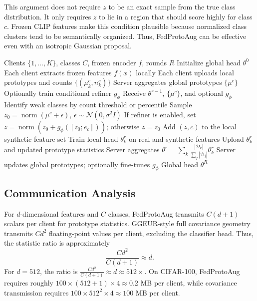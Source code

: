 ﻿\documentclass[conference]{IEEEtran}
\newcommand{\method}{FedProtoAug}
\newcommand{\clip}{CLIP}
\begin{document}
This argument does not require $z$ to be an exact sample from the true class distribution. It only requires $z$ to lie in a region that should score highly for class $c$. Frozen \clip{} features make this condition plausible because normalized class clusters tend to be semantically organized. Thus, \method{} can be effective even with an isotropic Gaussian proposal.

\begin{algorithm}[t]
\caption{\method}
\label{alg:fedprotoaug}
\begin{algorithmic}[1]
\Require Clients $\{1,\ldots,K\}$, classes $C$, frozen encoder $f$, rounds $R$
\State Initialize global head $\theta^0$
\State Each client extracts frozen features $f(x)$ locally
\State Each client uploads local prototypes and counts $\{(\mu_k^c,n_k^c)\}$
\State Server aggregates global prototypes $\{\mu^c\}$
\State Optionally train conditional refiner $g_\phi$
        \State Receive $\theta^{r-1}$, $\{\mu^c\}$, and optional $g_\phi$
        \State Identify weak classes by count threshold or percentile
            \State Sample $z_0=\operatorname{norm}(\mu^c+\epsilon)$, $\epsilon\sim\mathcal{N}(0,\sigma^2I)$
            \State If refiner is enabled, set $z=\operatorname{norm}(z_0+g_\phi([z_0;e_c]))$; otherwise $z=z_0$
            \State Add $(z,c)$ to the local synthetic feature set
        \EndFor
        \State Train local head $\theta_k^r$ on real and synthetic features
        \State Upload $\theta_k^r$ and updated prototype statistics
    \EndFor
    \State Server aggregates $\theta^r=\sum_k \frac{|\mathcal{D}_k|}{\sum_j|\mathcal{D}_j|}\theta_k^r$
    \State Server updates global prototypes; optionally fine-tunes $g_\phi$
\EndFor
\State \Return Global head $\theta^R$
\end{algorithmic}
\end{algorithm}

\subsection{Communication Analysis}
For $d$-dimensional features and $C$ classes, \method{} transmits $C(d+1)$ scalars per client for prototype statistics. GGEUR-style full covariance geometry transmits $Cd^2$ floating-point values per client, excluding the classifier head. Thus, the statistic ratio is approximately
\begin{equation}
\frac{Cd^2}{C(d+1)} \approx d.
\end{equation}
For $d=512$, the ratio is $\frac{Cd^2}{C(d+1)} \approx d \approx 512\times$. On CIFAR-100, \method{} requires roughly $100\times(512+1)\times4\approx0.2$ MB per client, while covariance transmission requires $100\times512^2\times4\approx100$ MB per client.
\end{document}
